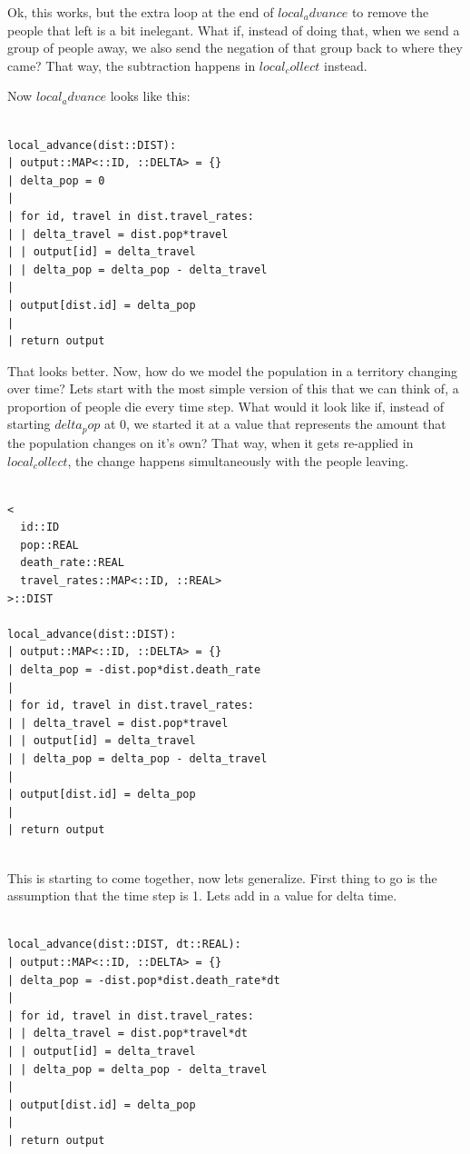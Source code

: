 \documentclass[twocolumn]{article}
\begin{document}
Ok, this works, but the extra loop at the end of $local_advance$ to remove the people that left is a bit inelegant. What if, instead of doing that, when we send a group of people away, we also send the negation of that group back to where they came? That way, the subtraction happens in $local_collect$ instead.

Now $local_advance$ looks like this:

\begin{verbatim}

local_advance(dist::DIST):
| output::MAP<::ID, ::DELTA> = {}
| delta_pop = 0
| 
| for id, travel in dist.travel_rates:
| | delta_travel = dist.pop*travel
| | output[id] = delta_travel
| | delta_pop = delta_pop - delta_travel 
|
| output[dist.id] = delta_pop
|
| return output

\end{verbatim}

That looks better. Now, how do we model the population in a territory changing over time? 
Lets start with the most simple version of this that we can think of, a proportion of people die every time step.
What would it look like if, instead of starting $delta_pop$ at 0, we started it at a value that represents the amount that the population changes on it's own?
That way, when it gets re-applied in $local_collect$, the change happens simultaneously with the people leaving.

\begin{verbatim}

<
  id::ID
  pop::REAL
  death_rate::REAL
  travel_rates::MAP<::ID, ::REAL>
>::DIST

local_advance(dist::DIST):
| output::MAP<::ID, ::DELTA> = {}
| delta_pop = -dist.pop*dist.death_rate
| 
| for id, travel in dist.travel_rates:
| | delta_travel = dist.pop*travel
| | output[id] = delta_travel
| | delta_pop = delta_pop - delta_travel 
|
| output[dist.id] = delta_pop
|
| return output
	
\end{verbatim}

This is starting to come together, now lets generalize. First thing to go is the assumption that the time step is 1. Lets add in a value for delta time.

\begin{verbatim}

local_advance(dist::DIST, dt::REAL):
| output::MAP<::ID, ::DELTA> = {}
| delta_pop = -dist.pop*dist.death_rate*dt
| 
| for id, travel in dist.travel_rates:
| | delta_travel = dist.pop*travel*dt
| | output[id] = delta_travel
| | delta_pop = delta_pop - delta_travel 
|
| output[dist.id] = delta_pop
|
| return output
	
\end{verbatim}
\end{document}
